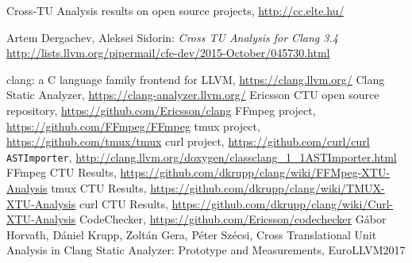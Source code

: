 \documentclass{article}
\begin{document}
\begin{thebibliography}{9}
 Cross-TU Analysis results on open source projects, \url{http://cc.elte.hu/}

 Artem Dergachev, Aleksei Sidorin: \emph{Cross TU Analysis for Clang 3.4}
  \url{http://lists.llvm.org/pipermail/cfe-dev/2015-October/045730.html}

 clang: a C language family frontend for LLVM, \url{https://clang.llvm.org/}
 Clang Static Analyzer, \url{https://clang-analyzer.llvm.org/}
 Ericsson CTU open source repository, \url{https://github.com/Ericsson/clang}
 FFmpeg project, \url{https://github.com/FFmpeg/FFmpeg}
 tmux project, \url{https://github.com/tmux/tmux}
 curl project, \url{https://github.com/curl/curl}
 \texttt{ASTImporter}, \url{http://clang.llvm.org/doxygen/classclang_1_1ASTImporter.html}
 FFmpeg CTU Results, {\small \url{https://github.com/dkrupp/clang/wiki/FFMpeg-XTU-Analysis}}
 tmux CTU Results, \url{https://github.com/dkrupp/clang/wiki/TMUX-XTU-Analysis}
 curl CTU Results, \url{https://github.com/dkrupp/clang/wiki/Curl-XTU-Analysis}
 CodeChecker, \url{https://github.com/Ericsson/codechecker}
 G\'abor Horva\'th, D\'aniel Krupp, Zolt\'an Gera, P\'eter Sz\'ecsi, Cross Translational Unit Analysis in Clang Static Analyzer: Prototype and Measurements, EuroLLVM2017
\end{thebibliography}
\end{document}
